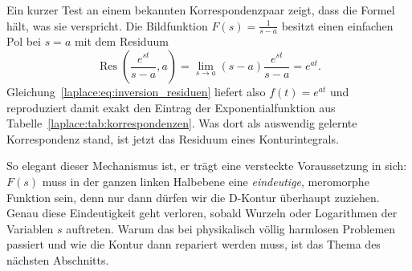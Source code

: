 Ein kurzer Test an einem bekannten Korrespondenzpaar zeigt, dass die Formel
hält, was sie verspricht.
Die Bildfunktion $F(s) = \frac{1}{s-a}$ besitzt einen einfachen Pol bei
$s = a$ mit dem Residuum
\begin{equation}
    \operatorname{Res}\left(\frac{e^{st}}{s-a}, a\right)
    =
    \lim_{s \to a} (s-a) \frac{e^{st}}{s-a}
    =
    e^{at}.
    \label{laplace:eq:beispiel_exponential}
\end{equation}
Gleichung~\eqref{laplace:eq:inversion_residuen} liefert also
$f(t) = e^{at}$ und reproduziert damit exakt den Eintrag der
Exponentialfunktion aus Tabelle~\ref{laplace:tab:korrespondenzen}.
Was dort als auswendig gelernte Korrespondenz stand, ist jetzt das Residuum
eines Konturintegrals.

So elegant dieser Mechanismus ist, er trägt eine versteckte Voraussetzung
in sich:
$F(s)$ muss in der ganzen linken Halbebene eine \emph{eindeutige},
meromorphe Funktion sein, denn nur dann dürfen wir die D-Kontur überhaupt
zuziehen.
Genau diese Eindeutigkeit geht verloren, sobald Wurzeln oder Logarithmen
der Variablen $s$ auftreten.
Warum das bei physikalisch völlig harmlosen Problemen passiert und wie die
Kontur dann repariert werden muss, ist das Thema des nächsten Abschnitts.
